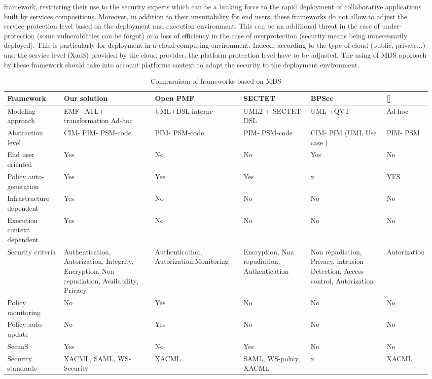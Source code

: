 \documentclass[runningheads,a4paper]{llncs}
\begin{document}
framework, restricting their use to the security experts which can be a braking force to the rapid deployment of collaborative applications built by services compositions. Moreover, in addition to their unsuitability for end users, these frameworks do not allow to adjust the service protection level based on the deployment and execution environment. This can be an additional threat in the case of under-protection (some vulnerabilities can be forgot) or a loss of efficiency in the case of overprotection (security means being unnecessarily deployed). This is particularly for deployment in a cloud computing environment. Indeed, according to the type of cloud (public, private...) and the service level (XaaS) provided by the cloud provider, the platform protection level have to be adjusted. The using of MDS approach by these framework should take into account platforms context to adapt the security to the deployment environment.


\begin{landscape}
\begin{table}

\caption{Comparaison of frameworks based on MDS}
\begin{tabular}{@{}*{6}{|p{3.1cm}}|@{} }
\hline\noalign{\smallskip}
Framework & Our solution   & Open PMF & SECTET & BPSec & []\\[0.2cm]
  \hline
  Modeling approach & EMF+ATL+ transformation Ad-hoc  & UML+DSL interne & UML2 + SECTET DSL & UML +QVT & Ad hoc\\
  Abstraction level & CIM- PIM- PSM-code  &  PIM- PSM-code  &  PIM- PSM-code &  CIM- PIM (UML Use case )&  PIM- PSM\\
  End user oriented & Yes & No & No & Yes & No\\
  Policy auto-generation & Yes & Yes & Yes & x & YES\\
  Infrastructure dependent & Yes & No & No & No & No\\
  Execution context dependent & Yes & No & No & No & No\\
  Security criteria &  Authentication, Autorization,  Integrity, Encryption, Non repudiation, Availability, Privacy & Authentication, Autorization,Monitoring & Encryption, Non repudiation, Authentication & Non  r\'epudiation, 
Privacy,  intrusion Detection,  Access control, Autorization & Autorization \\
  Policy monitoring & No & Yes & No & No & No\\
  Policy auto-update & No & Yes & No & No & No\\
  SecaaS & Yes & No & Yes & No & No\\
  Security standards  & XACML,  SAML,  WS-Security & XACML  & SAML,  WS-policy, XACML & x & XACML\\

\hline
\end{tabular}
\end{table}
\end{landscape}
\end{document}
